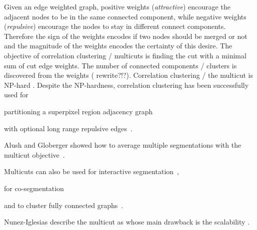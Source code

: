 \documentclass[10pt,twocolumn,letterpaper]{article}
\begin{document}


Given an edge weighted graph, positive weights (\emph{attractive})
encourage the adjacent nodes to be in the same 
connected component, while negative weights (\emph{repulsive}) encourage
the nodes to stay in different connect components.
Therefore the sign of the weights encodes if two
nodes should be merged or not and the magnitude of the weights encodes
the certainty of this desire.
The objective of correlation clustering / multicuts
is finding the cut with a minimal sum of cut edge weights.
The number of connected components / clusters is discovered
from the weights ( rewrite?!?).
Correlation clustering / the multicut is NP-hard \cite{???}.
%
Despite the NP-hardness, correlation clustering has been 
successfully used for
\begin{inparaenum}[(i)]
    \item partitioning a superpixel region adjacency graph~\cite{andres_2011_iccv,kroeger_2012_eccv}
    \item with optional long range repulsive edges~\cite{andres_2013_emmcvpr}.
    \item Alush and Globerger showed how to average multiple segmentations with the multicut objective~\cite{alush_2012_pami}.
    \item Multicuts can also be used for interactive segmentation~\cite{bagon_2011_arxiv},
    \item for co-segmentation~\cite{glassner_2011_cvpr}
    \item and to cluster fully connected graphs~\cite{???}.
\end{inparaenum}







Nunez-Iglesias \etal describe the multicut as
 whose 
main drawback is the scalability \cite{nunez_iglesias_2013}.

\end{document}
